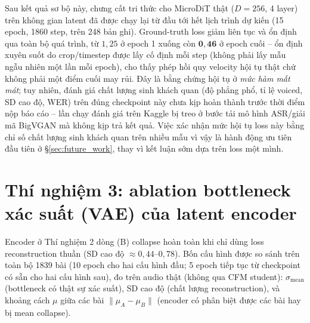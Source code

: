 \documentclass[a4paper,13pt,oneside]{report}
\begin{document}
Sau kết quả sơ bộ này, chưng cất tri thức cho MicroDiT thật ($D=256$, 4 layer) trên không
gian latent đã được chạy lại từ đầu tới hết lịch trình dự kiến (15 epoch, 1860 step, trên
248 bản ghi). Ground-truth loss giảm liên tục và ổn định qua toàn bộ quá trình, từ
$1{,}25$ ở epoch 1 xuống còn $\mathbf{0{,}46}$ ở epoch cuối -- ổn định xuyên suốt do
crop/timestep được lấy cố định mỗi step (không phải lấy mẫu ngẫu nhiên một lần mỗi epoch),
cho thấy phép hồi quy velocity hội tụ thật chứ không phải một điểm cuối
may rủi. Đây là bằng chứng hội tụ ở \emph{mức hàm mất mát}; tuy nhiên, đánh giá chất lượng
sinh khách quan (độ phẳng phổ, tỉ lệ voiced, SD cao độ, WER) trên đúng checkpoint này chưa
kịp hoàn thành trước thời điểm nộp báo cáo -- lần chạy đánh giá trên Kaggle bị treo ở bước
tải mô hình ASR/giải mã BigVGAN mà không kịp trả kết quả. Việc xác nhận mức hội tụ loss
này bằng chỉ số chất lượng sinh khách quan trên nhiều mẫu vì vậy là hành động ưu tiên đầu
tiên ở \S\ref{sec:future_work}, thay vì kết luận sớm dựa trên loss một mình.

\section{Thí nghiệm 3: ablation bottleneck xác suất (VAE) của latent encoder}
\label{sec:exp5_vae}

Encoder ở Thí nghiệm 2 dòng (B) collapse hoàn toàn khi chỉ dùng loss reconstruction thuần
(SD cao độ $\approx0{,}44$--$0{,}78$). Bốn cấu hình được so sánh trên
toàn bộ 1839 bài (10 epoch cho hai cấu hình đầu; 5 epoch tiếp tục từ checkpoint có sẵn cho
hai cấu hình sau), đo trên audio thật (không qua CFM student): $\sigma_{\text{mean}}$
(bottleneck có thật sự xác suất), SD cao độ (chất lượng
reconstruction), và khoảng cách $\mu$ giữa các bài $\lVert\mu_A-\mu_B\rVert$ (encoder có
phân biệt được các bài hay bị mean collapse).
\end{document}

